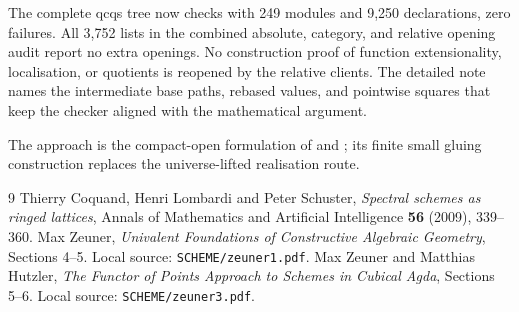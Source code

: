 \documentclass[11pt]{amsart}
\theoremstyle{definition}\newtheorem{definition}[theorem]{Definition}
\theoremstyle{remark}\newtheorem{remark}[theorem]{Remark}
\begin{document}
The complete qcqs tree now checks with 249 modules and 9,250 declarations,
zero failures. All 3,752 lists in the combined absolute, category, and
relative opening audit report no extra openings. No construction proof
of function extensionality, localisation, or quotients is reopened by
the relative clients. The detailed note names the intermediate base
paths, rebased values, and pointwise squares that keep the checker
aligned with the mathematical argument.

The approach is the compact-open formulation of
\cite[Sections 4--5]{Zeuner} and \cite[Sections 5--6]{ZH}; its finite
small gluing construction replaces the universe-lifted realisation route.
\par\endgroup

\begin{thebibliography}{9}
 Thierry Coquand, Henri Lombardi and Peter Schuster,
\emph{Spectral schemes as ringed lattices}, Annals of Mathematics and
Artificial Intelligence \textbf{56} (2009), 339--360.
 Max Zeuner, \emph{Univalent Foundations of Constructive
Algebraic Geometry}, Sections 4--5. Local source: \texttt{SCHEME/zeuner1.pdf}.
 Max Zeuner and Matthias Hutzler, \emph{The Functor of Points
Approach to Schemes in Cubical Agda}, Sections 5--6.
Local source: \texttt{SCHEME/zeuner3.pdf}.
\end{thebibliography}
\end{document}
